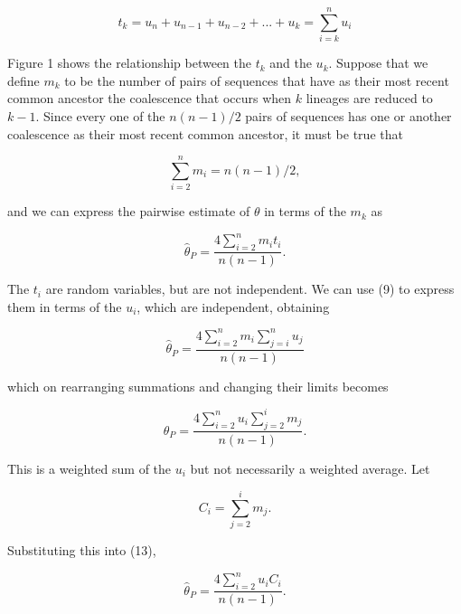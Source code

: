 \begin{equation} %
      t_k   =    u_n + u_{n-1} + u_{n-2} + ... + u_k   =   \sum\limits_{i=k}^n u_i
\end{equation}

Figure 1 shows the relationship between the $t_k$ and the $u_k$.
Suppose that we define $m_k$ to be the number of pairs of sequences that
have as their most recent common ancestor the coalescence that occurs when
$k$ lineages are reduced to $k-1$.  Since
every one of the $n(n-1)/2$ pairs of sequences has one or another
coalescence as their most recent common ancestor, it must be true that

\begin{equation} %
           \sum\limits_{i=2}^n m_i    =    n (n-1) / 2,
\end{equation}

and we can express the pairwise estimate of $\theta$ in terms of the $m_k$ as

\begin{equation} %
         \hat{\theta}_{P}  =  \frac{4 \sum\limits_{i=2}^n m_i t_i}{n(n-1)}.
\end{equation}

The $t_i$ are random variables, but are not independent.  We can use (9) to
express them in terms of the $u_i$, which are independent, obtaining

\begin{equation} %
        \hat{\theta}_{P} =  \frac{4 \sum\limits_{i=2}^n m_i 
\sum\limits_{j=i}^n u_j}{n (n-1)}
\end{equation}

which on rearranging summations and changing their limits becomes

\begin{equation} %
        \hat{\theta}_{P}  =  \frac{4 \sum\limits_{i=2}^n u_i
\sum\limits_{j=2}^i m_j}{n (n-1)}.
\end{equation}

This is a weighted sum of the $u_i$ but not necessarily a weighted
average.  Let

\begin{equation} %
      C_i  =  \sum\limits_{j=2}^i m_j.
\end{equation}

Substituting this into (13), 

\begin{equation} %
         \hat{\theta}_{P}  =  \frac{4 \sum\limits_{i=2}^n u_i C_i}{n (n-1)}.
\end{equation}

